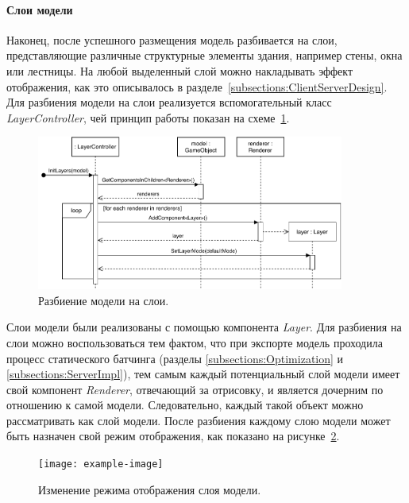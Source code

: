 ﻿\paragraph{Слои модели}

Наконец, после успешного размещения модель разбивается на слои,
представляющие различные структурные элементы здания,
например стены, окна или лестницы. На любой выделенный слой
можно накладывать эффект отображения, как это описывалось
в разделе~\ref{subsections:ClientServerDesign}.
Для разбиения модели на слои реализуется вспомогательный класс
\emph{LayerController}, чей принцип работы показан
на схеме~\ref{figure:SInitLayers}.

\begin{figure}[!htp]
    \centering
    \includegraphics[width=0.9\textwidth]{images/UML-SInitLayers.pdf}
    \caption{Разбиение модели на слои.}
    \label{figure:SInitLayers}
\end{figure}

Слои модели были реализованы с помощью компонента \emph{Layer}.
Для разбиения на слои можно воспользоваться тем фактом,
что при экспорте модель проходила процесс статического батчинга
(разделы \ref{subsections:Optimization} и \ref{subsections:ServerImpl}),
тем самым каждый потенциальный слой модели имеет свой компонент \emph{Renderer},
отвечающий за отрисовку, и является дочерним по отношению к самой модели.
Следовательно, каждый такой объект можно рассматривать как слой модели.
После разбиения каждому слою модели может быть назначен
свой режим отображения, как показано на рисунке~\ref{figure:SLayerSetMode}.

\begin{figure}[!htp]
    \centering
    \texttt{[image: example-image]}
    \caption{Изменение режима отображения слоя модели.}
    \label{figure:SLayerSetMode}
\end{figure}

